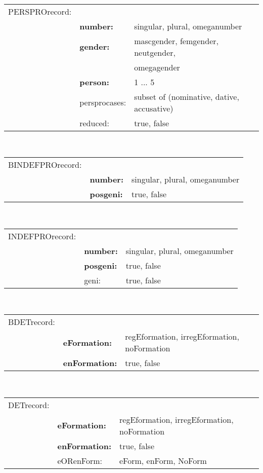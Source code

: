 \\
\begin{tabular}{lll}
PERSPROrecord:  &                 &              \\
                & {\bf number:}   & singular, plural, omeganumber   \\
                & {\bf gender:}   & mascgender, femgender, neutgender, \\
                &                 &                     omegagender \\
                & {\bf person:}   & 1 ... 5                  \\
                & persprocases:  & subset of (nominative, dative, accusative) \\
                & reduced:        & true, false           \\
\end{tabular}
\\
\begin{tabular}{lll}
BINDEFPROrecord: &                &              \\
                 & {\bf number:}  & singular, plural, omeganumber \\
                 & {\bf posgeni:} & true, false           \\
\end{tabular}
\\
\begin{tabular}{lll}
INDEFPROrecord: &                 &              \\
                & {\bf number:}   & singular, plural, omeganumber \\
                & {\bf posgeni:}  & true, false           \\
                & geni:                 & true, false           \\
\end{tabular}
\\
\begin{tabular}{lll}
BDETrecord: &                    &              \\
            & {\bf eFormation:}  & regEformation, irregEformation, noFormation  \\
            & {\bf enFormation:} & true, false           \\
\end{tabular}
\\
\begin{tabular}{lll}
DETrecord: &                    &              \\
           & {\bf eFormation:}  & regEformation, irregEformation, noFormation  \\
           & {\bf enFormation:} & true, false           \\
           & eORenForm:         & eForm, enForm, NoForm \\
\end{tabular}
